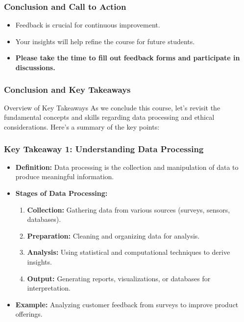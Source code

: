 \documentclass[aspectratio=169]{beamer}
\begin{document}
\begin{frame}[fragile]
    \frametitle{Conclusion and Call to Action}
    \begin{itemize}
        \item Feedback is crucial for continuous improvement.
        \item Your insights will help refine the course for future students.
        \item \textbf{Please take the time to fill out feedback forms and participate in discussions.}
    \end{itemize}
\end{frame}

\begin{frame}[fragile]
    \frametitle{Conclusion and Key Takeaways}
    \begin{block}{Overview of Key Takeaways}
        As we conclude this course, let’s revisit the fundamental concepts and skills regarding data processing and ethical considerations. Here’s a summary of the key points:
    \end{block}
\end{frame}

\begin{frame}[fragile]
    \frametitle{Key Takeaway 1: Understanding Data Processing}
    \begin{itemize}
        \item \textbf{Definition:} Data processing is the collection and manipulation of data to produce meaningful information.
        \item \textbf{Stages of Data Processing:}
        \begin{enumerate}
            \item \textbf{Collection:} Gathering data from various sources (surveys, sensors, databases).
            \item \textbf{Preparation:} Cleaning and organizing data for analysis.
            \item \textbf{Analysis:} Using statistical and computational techniques to derive insights.
            \item \textbf{Output:} Generating reports, visualizations, or databases for interpretation.
        \end{enumerate}
        \item \textbf{Example:} Analyzing customer feedback from surveys to improve product offerings.
    \end{itemize}
\end{frame}
\end{document}
